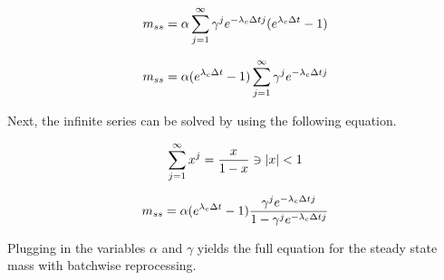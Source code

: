 \begin{equation} \hfill
m_{ss} = \alpha \sum_{j=1}^{\infty} \gamma^j e^{-\lambda_c \Delta t j} (e^{\lambda_c \Delta t} - 1)
\hfill \end{equation}

\begin{equation} \hfill
m_{ss} = \alpha (e^{\lambda_c \Delta t} - 1) \sum_{j=1}^{\infty} \gamma^j e^{-\lambda_c \Delta t j} 
\hfill \end{equation}

Next, the infinite series can be solved by using the following equation.

\begin{equation} \hfill
\sum_{j=1}^{\infty} x^j = \frac{x}{1-x} \ni |x| < 1
\hfill \end{equation}

\begin{equation} \hfill
m_{ss} = \alpha (e^{\lambda_c \Delta t} - 1) \frac{\gamma^j e^{-\lambda_c \Delta t j}}{1 - \gamma^j e^{-\lambda_c \Delta t j}}
\hfill \end{equation}

Plugging in the variables $\alpha$ and $\gamma$ yields the full equation for the steady state mass with batchwise reprocessing.


